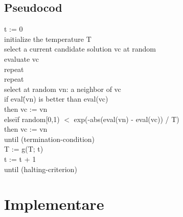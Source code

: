 \documentclass{article}
\begin{document}
\subsection*{Pseudocod}
\begin{tabbing}
t := 0\\
initialize the temperature T\\
select a current candidate solution vc at random\\
evaluate vc\\
repeat \=\\
\>  repeat\=\\
\>\>    select at random vn: a neighbor of vc\\
\>\>    if eval\=(vn) is better than eval(vc)\\
\>\>\>      then vc := vn\\
\>\>\>      else\= if random[0,1) $<$ exp(-abs(eval(vn) - eval(vc)) / T)\\
\>\>\>\>        then vc := vn\\
\>  until (termination-condition)\\
\>  T := g(T; t) \\
\>  t := t + 1\\
until (halting-criterion)
\end{tabbing}

\section{Implementare}
\end{document}
